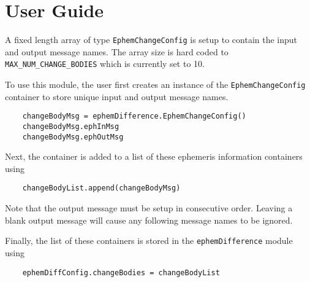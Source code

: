 
\section{User Guide}

A fixed length array of type {\tt EphemChangeConfig} is setup to contain the input and output message names.  The array size is hard coded to {\tt MAX\_NUM\_CHANGE\_BODIES} which is currently set to 10.  

To use this module, the user first creates an instance of the {\tt EphemChangeConfig} container to store unique input and output message names.
\begin{verbatim}
	changeBodyMsg = ephemDifference.EphemChangeConfig()
	changeBodyMsg.ephInMsg 
	changeBodyMsg.ephOutMsg
\end{verbatim}
Next, the container is added to a list of these ephemeris information containers using 
\begin{verbatim}
	changeBodyList.append(changeBodyMsg)
\end{verbatim}
Note that the output message must be setup in consecutive order.  Leaving a blank output message will cause any following message names to be ignored. 

Finally, the list of these containers is stored in the {\tt ephemDifference} module using
\begin{verbatim}
	ephemDiffConfig.changeBodies = changeBodyList
\end{verbatim}

